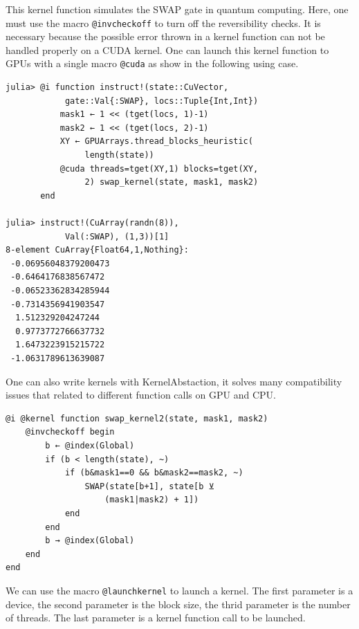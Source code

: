 \documentclass[aps,twocolumn,longbibliography,english,superscriptaddress]{revtex4-1}
\newcommand{\<}{\langle}
\renewcommand{\>}{\rangle}
\theoremstyle{definition}\newtheorem{definition}{\textit{Definition}}
\begin{document}
This kernel function simulates the SWAP gate in quantum computing.
Here, one must use the macro \texttt{@invcheckoff} to turn off the reversibility checks. It is necessary because the possible error thrown in a kernel function can not be handled properly on a CUDA kernel.
One can launch this kernel function to GPUs with a single macro \texttt{@cuda} as show in the following using case.

\begin{minipage}{.44\textwidth}
\begin{lstlisting}
julia> @i function instruct!(state::CuVector,
            gate::Val{:SWAP}, locs::Tuple{Int,Int})
           mask1 ← 1 << (tget(locs, 1)-1)
           mask2 ← 1 << (tget(locs, 2)-1)
           XY ← GPUArrays.thread_blocks_heuristic(
                length(state))
           @cuda threads=tget(XY,1) blocks=tget(XY,
                2) swap_kernel(state, mask1, mask2)
       end

julia> instruct!(CuArray(randn(8)),
            Val(:SWAP), (1,3))[1]
8-element CuArray{Float64,1,Nothing}:
 -0.06956048379200473
 -0.6464176838567472
 -0.06523362834285944
 -0.7314356941903547
  1.512329204247244
  0.9773772766637732
  1.6473223915215722
 -1.0631789613639087
\end{lstlisting}
\end{minipage}

One can also write kernels with KernelAbstaction, it solves many compatibility issues that related to different function calls on GPU and CPU.


\begin{minipage}{.44\textwidth}
\begin{lstlisting}
@i @kernel function swap_kernel2(state, mask1, mask2)
    @invcheckoff begin
        b ← @index(Global)
        if (b < length(state), ~)
            if (b&mask1==0 && b&mask2==mask2, ~)
                SWAP(state[b+1], state[b ⊻ 
                    (mask1|mask2) + 1])
            end
        end
        b → @index(Global)
    end
end
\end{lstlisting}
\end{minipage}

We can use the macro \texttt{@launchkernel} to launch a kernel.
The first parameter is a device, the second parameter is the block size,
the thrid parameter is the number of threads.
The last parameter is a kernel function call to be launched.
\end{document}
